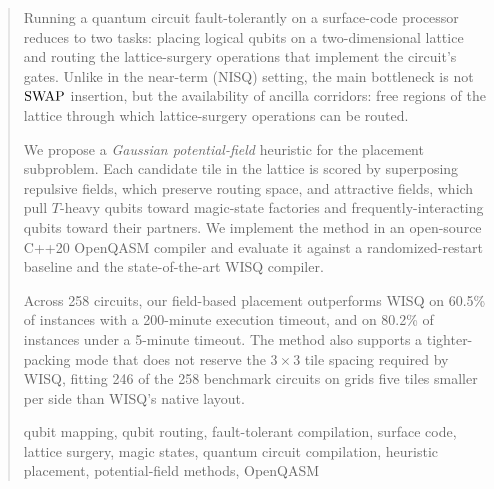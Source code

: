 \begin{abstract}
Running a quantum circuit fault-tolerantly on a surface-code processor reduces
to two tasks: placing logical qubits on a two-dimensional lattice and
routing the lattice-surgery operations that implement the circuit's gates. Unlike in the
near-term (NISQ) setting, the main bottleneck is not $\SWAP{}$ insertion, but
the availability of ancilla corridors: free regions of the lattice through which
lattice-surgery operations can be routed.

We propose a \emph{Gaussian potential-field} heuristic for the placement
subproblem. Each candidate tile in the lattice is scored by superposing
repulsive fields, which preserve routing space, and attractive fields,
which pull $T$-heavy qubits toward magic-state factories and frequently-interacting
qubits toward their partners. We implement the method in an
open-source C++20 OpenQASM compiler and evaluate it against a
randomized-restart baseline and the state-of-the-art WISQ compiler.

Across 258 circuits, our field-based placement outperforms WISQ on 60.5\% of
instances with a 200-minute execution timeout, and on 80.2\% of instances under
a 5-minute timeout. The method also supports a tighter-packing mode that does
not reserve the $3 \times 3$ tile spacing required by WISQ, fitting 246 of the
258 benchmark circuits on grids five tiles smaller per side than
WISQ's native layout.


\begin{IEEEkeywords}
qubit mapping, qubit routing, fault-tolerant compilation, surface code,
lattice surgery, magic states, quantum circuit compilation, heuristic placement,
potential-field methods, OpenQASM
\end{IEEEkeywords}

\end{abstract}
